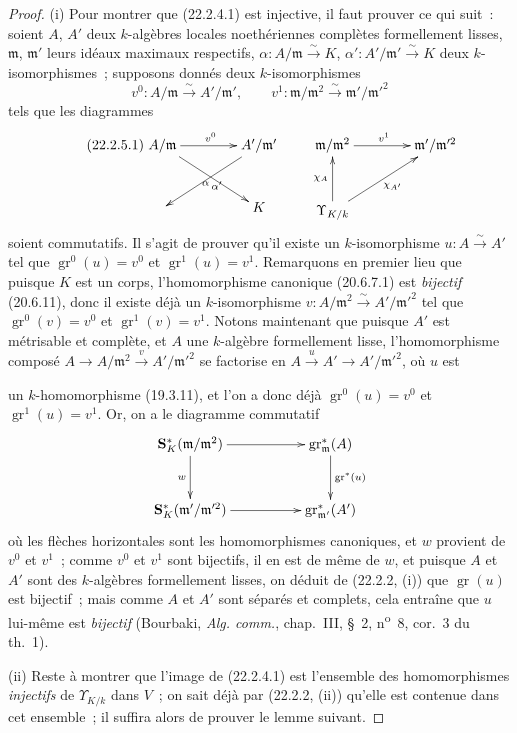 \begin{proof}
(i) Pour montrer que (22.2.4.1) est injective, il faut prouver ce qui suit~:
soient $A$, $A'$ deux $k$-algèbres locales noethériennes complètes
formellement lisses, $\mathfrak m$, $\mathfrak m'$ leurs idéaux maximaux
respectifs, $\alpha:A/\mathfrak m\xrightarrow{\sim}K$,
$\alpha':A'/\mathfrak m'\xrightarrow{\sim}K$ deux $k$-isomorphismes~;
supposons donnés deux $k$-isomorphismes
\[
  v^0:A/\mathfrak m\xrightarrow{\sim}A'/\mathfrak m',\qquad
  v^1:\mathfrak m/\mathfrak m^2\xrightarrow{\sim}
      \mathfrak m'/\mathfrak m'^2
\]
tels que les diagrammes
\begin{equation}
\tag{22.2.5.1}
\label{0.22.2.5.1-fr}
\xymatrix@C=4em@R=3em{
  A/\mathfrak m \ar[r]^{v^0} \ar[dr]_{\alpha} &
  A'/\mathfrak m' \ar[dl]^{\alpha'} \\
  & K
}
\qquad
\xymatrix@C=4em@R=3em{
  \mathfrak m/\mathfrak m^2 \ar[r]^{v^1} &
  \mathfrak m'/\mathfrak m'^2 \\
  \Upsilon_{K/k} \ar[u]^{\chi_A} \ar[ur]_{\chi_{A'}} &
}
\end{equation}
soient commutatifs. Il s'agit de prouver qu'il existe un $k$-isomorphisme
$u:A\xrightarrow{\sim}A'$ tel que $\operatorname{gr}^0(u)=v^0$ et
$\operatorname{gr}^1(u)=v^1$. Remarquons en premier lieu que puisque $K$ est
un corps, l'homomorphisme canonique (20.6.7.1) est \emph{bijectif} (20.6.11),
donc il existe déjà un $k$-isomorphisme
$v:A/\mathfrak m^2\xrightarrow{\sim}A'/\mathfrak m'^2$ tel que
$\operatorname{gr}^0(v)=v^0$ et $\operatorname{gr}^1(v)=v^1$. Notons
maintenant que puisque $A'$ est métrisable et complète, et $A$ une
$k$-algèbre formellement lisse, l'homomorphisme composé
$A\to A/\mathfrak m^2\xrightarrow{v}A'/\mathfrak m'^2$ se factorise en
$A\xrightarrow{u}A'\to A'/\mathfrak m'^2$, où $u$ est


un $k$-homomorphisme (19.3.11), et l'on a donc déjà
$\operatorname{gr}^0(u)=v^0$ et $\operatorname{gr}^1(u)=v^1$. Or, on a le
diagramme commutatif
\[
\xymatrix@C=5em@R=3em{
  \mathbf S_K^*(\mathfrak m/\mathfrak m^2) \ar[r] \ar[d]_{w} &
  \operatorname{gr}_{\mathfrak m}^*(A) \ar[d]^{\operatorname{gr}^*(u)} \\
  \mathbf S_K^*(\mathfrak m'/\mathfrak m'^2) \ar[r] &
  \operatorname{gr}_{\mathfrak m'}^*(A')
}
\]
où les flèches horizontales sont les homomorphismes canoniques, et $w$
provient de $v^0$ et $v^1$~; comme $v^0$ et $v^1$ sont bijectifs, il en est
de même de $w$, et puisque $A$ et $A'$ sont des $k$-algèbres formellement
lisses, on déduit de (22.2.2, (i)) que $\operatorname{gr}(u)$ est bijectif~;
mais comme $A$ et $A'$ sont séparés et complets, cela entraîne que $u$
lui-même est \emph{bijectif} (Bourbaki, \emph{Alg. comm.}, chap.~III, §~2,
n\textsuperscript{o}~8, cor.~3 du th.~1).

(ii) Reste à montrer que l'image de (22.2.4.1) est l'ensemble des
homomorphismes \emph{injectifs} de $\Upsilon_{K/k}$ dans $V$~; on sait déjà
par (22.2.2, (ii)) qu'elle est contenue dans cet ensemble~; il suffira alors
de prouver le lemme suivant.
\end{proof}

